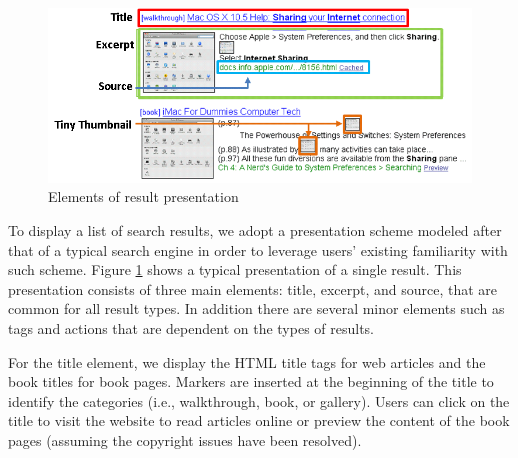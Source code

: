 \documentclass{www2010-submission}
\begin{document}



\begin{figure}
\includegraphics[width=\columnwidth]{figure/result_tile.png}
\caption{Elements of result presentation}
\label{fig:result_tile}
\end{figure}

To display a list of search results, we adopt a presentation scheme 
modeled after that of a typical search engine in order to 
leverage users' existing familiarity with such scheme.  Figure
\ref{fig:result_tile} shows a typical presentation of a single
result. This presentation consists of three main elements: title,
excerpt, and source, that are common for all result types. In addition
there are several minor elements such as tags and actions that
are dependent on the types of results.

For the title element, we display the HTML title tags for web articles
and the book titles for book pages. Markers are inserted
at the beginning of the title to identify the categories (i.e.,
walkthrough, book, or gallery). Users can click on the title to
visit the website to read articles online or preview the content of
the book pages (assuming the copyright issues have been resolved).
\end{document}
